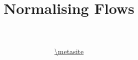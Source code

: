 \documentclass[14pt]{beamer}
\title[NFs]{Normalising Flows}
\date{}
\author[VI Tutorial @ \metahost]{ \metaauthor \\ 
~\\
\url{\metasite}
}
\institute[]{\metaack}
\begin{document}
\frame{\titlepage}

\frame{\tableofcontents}


\end{document}
